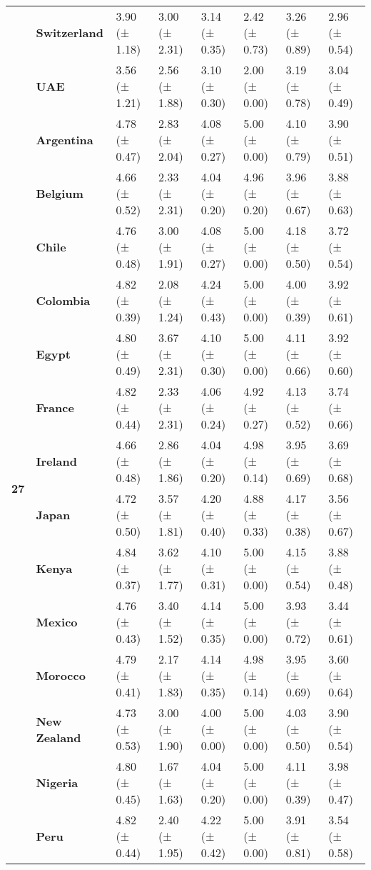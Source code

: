 \begin{longtable}{llllllll}
\textbf{} & \textbf{Switzerland} & 3.90 (± 1.18) & 3.00 (± 2.31) & 3.14 (± 0.35) & 2.42 (± 0.73) & 3.26 (± 0.89) & 2.96 (± 0.54) \\
\textbf{} & \textbf{UAE} & 3.56 (± 1.21) & 2.56 (± 1.88) & 3.10 (± 0.30) & 2.00 (± 0.00) & 3.19 (± 0.78) & 3.04 (± 0.49) \\
\cline{1-8}
\multirow[t]{19}{*}{\textbf{27}} & \textbf{Argentina} & 4.78 (± 0.47) & 2.83 (± 2.04) & 4.08 (± 0.27) & 5.00 (± 0.00) & 4.10 (± 0.79) & 3.90 (± 0.51) \\
\textbf{} & \textbf{Belgium} & 4.66 (± 0.52) & 2.33 (± 2.31) & 4.04 (± 0.20) & 4.96 (± 0.20) & 3.96 (± 0.67) & 3.88 (± 0.63) \\
\textbf{} & \textbf{Chile} & 4.76 (± 0.48) & 3.00 (± 1.91) & 4.08 (± 0.27) & 5.00 (± 0.00) & 4.18 (± 0.50) & 3.72 (± 0.54) \\
\textbf{} & \textbf{Colombia} & 4.82 (± 0.39) & 2.08 (± 1.24) & 4.24 (± 0.43) & 5.00 (± 0.00) & 4.00 (± 0.39) & 3.92 (± 0.61) \\
\textbf{} & \textbf{Egypt} & 4.80 (± 0.49) & 3.67 (± 2.31) & 4.10 (± 0.30) & 5.00 (± 0.00) & 4.11 (± 0.66) & 3.92 (± 0.60) \\
\textbf{} & \textbf{France} & 4.82 (± 0.44) & 2.33 (± 2.31) & 4.06 (± 0.24) & 4.92 (± 0.27) & 4.13 (± 0.52) & 3.74 (± 0.66) \\
\textbf{} & \textbf{Ireland} & 4.66 (± 0.48) & 2.86 (± 1.86) & 4.04 (± 0.20) & 4.98 (± 0.14) & 3.95 (± 0.69) & 3.69 (± 0.68) \\
\textbf{} & \textbf{Japan} & 4.72 (± 0.50) & 3.57 (± 1.81) & 4.20 (± 0.40) & 4.88 (± 0.33) & 4.17 (± 0.38) & 3.56 (± 0.67) \\
\textbf{} & \textbf{Kenya} & 4.84 (± 0.37) & 3.62 (± 1.77) & 4.10 (± 0.31) & 5.00 (± 0.00) & 4.15 (± 0.54) & 3.88 (± 0.48) \\
\textbf{} & \textbf{Mexico} & 4.76 (± 0.43) & 3.40 (± 1.52) & 4.14 (± 0.35) & 5.00 (± 0.00) & 3.93 (± 0.72) & 3.44 (± 0.61) \\
\textbf{} & \textbf{Morocco} & 4.79 (± 0.41) & 2.17 (± 1.83) & 4.14 (± 0.35) & 4.98 (± 0.14) & 3.95 (± 0.69) & 3.60 (± 0.64) \\
\textbf{} & \textbf{New Zealand} & 4.73 (± 0.53) & 3.00 (± 1.90) & 4.00 (± 0.00) & 5.00 (± 0.00) & 4.03 (± 0.50) & 3.90 (± 0.54) \\
\textbf{} & \textbf{Nigeria} & 4.80 (± 0.45) & 1.67 (± 1.63) & 4.04 (± 0.20) & 5.00 (± 0.00) & 4.11 (± 0.39) & 3.98 (± 0.47) \\
\textbf{} & \textbf{Peru} & 4.82 (± 0.44) & 2.40 (± 1.95) & 4.22 (± 0.42) & 5.00 (± 0.00) & 3.91 (± 0.81) & 3.54 (± 0.58) \\

\end{longtable}
